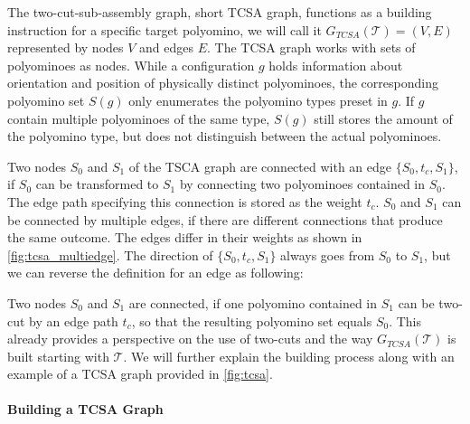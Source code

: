The two-cut-sub-assembly graph, short TCSA graph, functions as a building instruction for a specific target polyomino, we will call it $G_{\textit{TCSA}}(\mathcal{T}) = (V,E)$ represented by nodes $V$ and edges $E$.
The TCSA graph works with sets of polyominoes as nodes.
While a configuration $g$ holds information about orientation and position of physically distinct polyominoes, the corresponding polyomino set $S(g)$ only enumerates the polyomino types preset in $g$.
If $g$ contain multiple polyominoes of the same type, $S(g)$ still stores the amount of the polyomino type, but does not distinguish between the actual polyominoes.

Two nodes $S_0$ and $S_1$ of the TSCA graph are connected with an edge $\{S_0,t_c,S_1\}$, if $S_0$ can be transformed to $S_1$ by connecting two polyominoes contained in $S_0$.
The edge path specifying this connection is stored as the weight $t_c$.
$S_0$ and $S_1$ can be connected by multiple edges, if there are different connections that produce the same outcome.
The edges differ in their weights as shown in \autoref{fig:tcsa_multiedge}.
The direction of $\{S_0,t_c,S_1\}$ always goes from $S_0$ to $S_1$, but we can reverse the definition for an edge as following:

Two nodes $S_0$ and $S_1$ are connected, if one polyomino contained in $S_1$ can be two-cut by an edge path $t_c$, so that the resulting polyomino set equals $S_0$.
This already provides a perspective on the use of two-cuts and the way $G_{\textit{TCSA}}(\mathcal{T})$ is built starting with $\mathcal{T}$.
We will further explain the building process along with an example of a TCSA graph provided in \autoref{fig:tcsa}.


\paragraph{Building a TCSA Graph}

